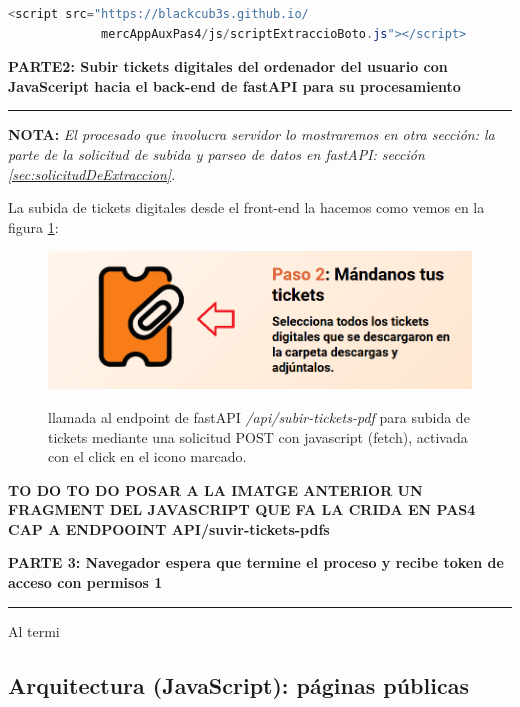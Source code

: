 \documentclass[a4paper,12pt]{report}
\begin{document}
	\begin{lstlisting}[language=java, basicstyle=\ttfamily\small]
<script src="https://blackcub3s.github.io/
             mercAppAuxPas4/js/scriptExtraccioBoto.js"></script>
	\end{lstlisting}
	
	


	\noindent \textbf{PARTE2: Subir tickets digitales del ordenador del usuario con JavaSceript hacia el back-end de fastAPI para su procesamiento}
	\hrule
	\vspace{.5em}
	
		
	\textbf{NOTA:} \textit{El procesado que involucra servidor lo mostraremos en otra sección: la parte de la solicitud de subida y parseo de datos en fastAPI: sección \ref{sec:solicitudDeExtraccion}.}
	
	
	La subida de tickets digitales desde el front-end la hacemos como vemos en la figura \ref{fig:pujarticketspas5}:
	
	\FloatBarrier
	\begin{figure}[H]
		\centering
		\caption{llamada al endpoint de fastAPI \textit{/api/subir-tickets-pdf} para subida de tickets mediante una solicitud POST con javascript (fetch), activada con el click en el icono marcado.}
		\includegraphics[width=1\linewidth]{img/pujarTicketsPas5}
		\label{fig:pujarticketspas5}
	\end{figure}
	\FloatBarrier
	
	\textbf{TO DO TO DO POSAR A LA IMATGE ANTERIOR UN FRAGMENT DEL JAVASCRIPT QUE FA LA CRIDA EN PAS4 CAP A ENDPOOINT API/suvir-tickets-pdfs}

			
	\noindent \textbf{PARTE 3: Navegador espera que termine el proceso y recibe token de acceso con permisos 1}
	\hrule
	\vspace{.5em}
	
	Al termi
		
	\subsection{Arquitectura (JavaScript): páginas públicas}
	\label{sec:arquitecturaPaginesPubliques}
	
\end{document}
